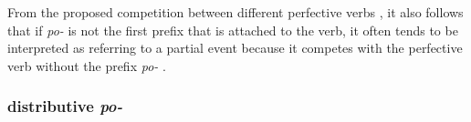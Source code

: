 From the proposed competition between different perfective verbs , it also follows that if \textit{po-}   is not the first prefix that is attached to the verb, it often tends to be interpreted as referring to a partial event because it competes with the perfective verb  without the prefix \textit{po-}  .



\subsubsection{distributive  \textit{po-}  }

